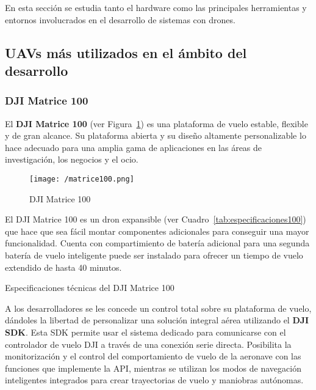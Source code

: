 En esta sección se estudia tanto el hardware como las principales herramientas y entornos involucrados en el desarrollo de sistemas con drones.

\subsection{UAVs más utilizados en el ámbito del desarrollo}
\label{sec:uavdesarrollo}

\subsubsection{DJI Matrice 100}
\label{sec:matrice100}

El \textbf{DJI Matrice 100} (ver Figura~\ref{fig:matrice100}) es una plataforma de vuelo estable, flexible y de gran alcance. Su plataforma abierta y su diseño altamente personalizable lo hace adecuado para una amplia gama de aplicaciones en las áreas de investigación, los negocios y el ocio.

\begin{figure}[!h]
\begin{center}
\texttt{[image: /matrice100.png]}
\caption[DJI Matrice 100]{DJI Matrice 100}
\label{fig:matrice100}
\end{center}
\end{figure}

El DJI Matrice 100 es un dron expansible (ver Cuadro~\ref{tab:especificaciones100}) que hace que sea fácil montar componentes adicionales para conseguir una mayor funcionalidad. Cuenta con compartimiento de batería adicional para una segunda batería de vuelo inteligente puede ser instalado para ofrecer un tiempo de vuelo extendido de hasta 40 minutos.

\begin{table}[!h]
 \centering
 {\small
 
 }
 \caption[Especificaciones técnicas del DJI Matrice 100]
 {Especificaciones técnicas del DJI Matrice 100 \cite{especifacionesmatrice100}}
 \label{tab:especificaciones100}
\end{table}

A los desarrolladores se les concede un control total sobre su plataforma de vuelo, dándoles la libertad de personalizar una solución integral aérea utilizando el \textbf{DJI SDK}. Esta SDK permite usar el sistema dedicado para comunicarse con el controlador de vuelo DJI a través de una conexión serie directa. Posibilita la monitorización y el control del comportamiento de vuelo de la aeronave con las funciones que implemente la \acs{API}, mientras se utilizan los modos de navegación inteligentes integrados para crear trayectorias de vuelo y maniobras autónomas.

